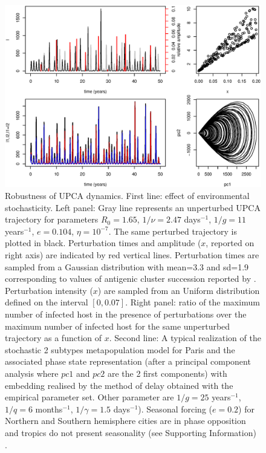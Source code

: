 \begin{figure}[htp]
  \center
    \includegraphics[width= 0.8 \linewidth]{texte/article2/graph/pert.eps}
    \caption{Robustness of UPCA dynamics.  %
      First line: effect of environmental stochasticity. Left panel:
      Gray line represents an unperturbed UPCA trajectory for
      parameters $R_0=1.65$, $1/\nu=2.47$ days$^{-1}$, $1/g=11$
      years$^{-1}$, $e=0.104$, $\eta=10^{-7}$. The same perturbed
      trajectory is plotted in black. Perturbation times and amplitude
      ($x$, reported on right axis) are indicated by red vertical
      lines. Perturbation times are sampled from a Gaussian
      distribution with mean=3.3 and sd=1.9 corresponding to values of
      antigenic cluster succession reported by
      \citet{Smith2004}. Perturbation intensity ($x$) are sampled from
      an Uniform distribution defined on the interval $[0, 0.07]$. Right panel: ratio of the
      maximum number of infected host in the presence of perturbations
      over the maximum number of infected host for the
      same unperturbed trajectory as a function of $x$.
      Second line: A typical realization of the stochastic 2 subtypes
      metapopulation model for Paris and the associated phase state
      representation (after a principal component analysis where $pc1$
      and $pc2$ are the 2 first components) with embedding realised by
      the method of delay obtained with the empirical parameter
      set. Other parameter are $1/g=25$ years$^{-1}$, $1/q=6$
      months$^{-1}$, $1/ \gamma=1.5$ days$^{-1}$). Seasonal forcing
      ($e=0.2$) for Northern and Southern hemisphere cities are in
      phase opposition and tropics do not present seasonality (see
      Supporting Information) .}
  \label{fig:pert}
\end{figure}

